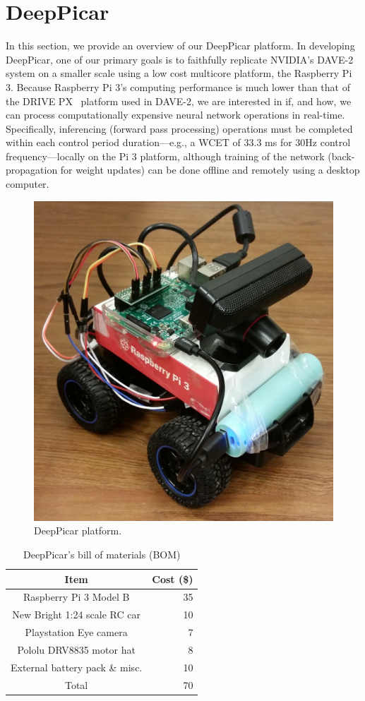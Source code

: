 
\section{DeepPicar}\label{sec:overview}

In this section, we provide an overview of our DeepPicar platform.
In developing DeepPicar, one of our primary goals is to faithfully
replicate NVIDIA's DAVE-2 system on a smaller scale using a low cost
multicore platform, the Raspberry Pi 3. Because Raspberry Pi 3's
computing performance is much lower than that of the DRIVE
PX~\cite{drivepx} platform used in DAVE-2, we are interested in if,
and how, we can process 
computationally expensive neural network operations in
real-time. Specifically, inferencing (forward pass processing)
operations must be completed within each control period
duration---e.g., a WCET of 33.3 ms for 30Hz control 
frequency---locally on the Pi 3 platform, although training of the 
network (back-propagation for weight updates) can be done offline and 
remotely using a desktop computer.

\begin{figure}[h]
  \centering
  \includegraphics[width=.4\textwidth]{figs/DeepPicar_platform}
  \caption{DeepPicar platform.}
  \label{fig:overview}
\end{figure}

\begin{table}[h]
  \centering
  \begin{tabular}{|c|r|}
    \hline
    Item                    & Cost (\$) \\
    \hline
    Raspberry Pi 3 Model B  & 35 \\
    New Bright 1:24 scale RC car       & 10 \\
    Playstation Eye camera  &  7 \\
    Pololu DRV8835 motor hat&  8 \\
    External battery pack \& misc.   & 10 \\
    \hline
    Total                   & 70 \\
    \hline
  \end{tabular}
  \caption{DeepPicar's bill of materials (BOM)}
  \label{tbl:carbom}
\end{table}

